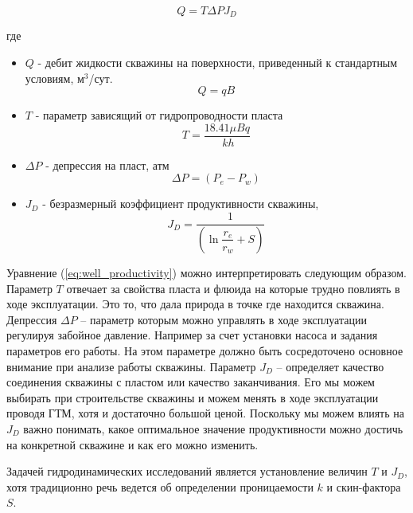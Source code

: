 \begin{equation} \label{eq:well_productivity}
	Q = T \Delta P J_D
\end{equation}

где
\begin{itemize}
	\item $Q$ - дебит жидкости скважины на поверхности, приведенный к стандартным условиям, м$^3$/сут. $$Q = qB$$
	
	\item $T$ - параметр зависящий от гидропроводности пласта 
	\begin{equation} \label{eq:T}
		T=\dfrac{18.41\mu B q }{\ k h}
	\end{equation}
	
	\item $\Delta P$ - депрессия на пласт, атм 
	\begin{equation} \label{eq:dP}
		\Delta P = \left(P_e-P_w\right)
	\end{equation}
	
	
	\item $J_D$ - безразмерный коэффициент продуктивности скважины, 
	\begin{equation} \label{eq:JD}
		J_D = \dfrac{1}{ \left(\ln{\dfrac{r_e}{r_w}} + S\right)}
	\end{equation}
	
	
\end{itemize}

Уравнение (\ref{eq:well_productivity}) можно интерпретировать следующим образом. Параметр $T$ отвечает за свойства пласта и флюида на которые трудно повлиять в ходе эксплуатации. Это то, что дала природа в точке где находится скважина. Депрессия $\Delta P$ -- параметр которым можно управлять в ходе эксплуатации регулируя забойное давление. Например за счет установки насоса и задания параметров его работы. На этом параметре должно быть сосредоточено основное внимание при анализе работы скважины. Параметр $J_D$ -- определяет качество соединения скважины с пластом или качество заканчивания. Его мы можем выбирать при строительстве скважины и можем менять в ходе эксплуатации проводя ГТМ, хотя и достаточно большой ценой. Поскольку мы можем влиять на $J_D$ важно понимать, какое оптимальное значение продуктивности можно достичь на конкретной скважине и как его можно изменить. 

Задачей гидродинамических исследований является установление величин $T$ и $J_D$, хотя традиционно речь ведется об определении проницаемости $k$ и скин-фактора $S$. 

